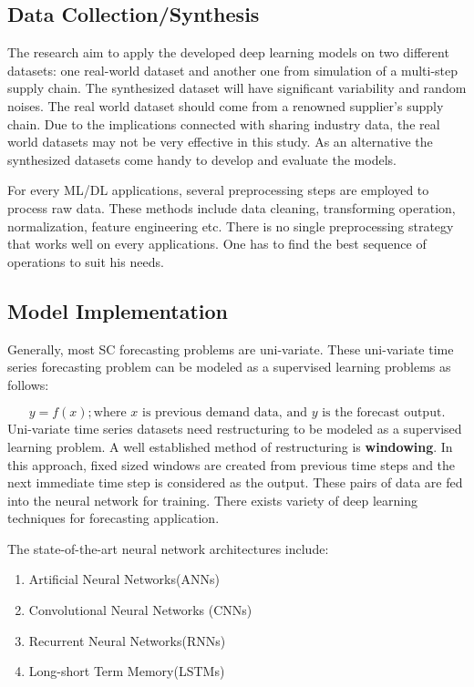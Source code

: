 \subsection{Data Collection/Synthesis}
The research aim to apply the developed deep learning models on two different datasets: one real-world dataset and another one from simulation of a multi-step supply chain. The synthesized dataset will have significant variability and random noises. The real world dataset should come from a renowned supplier's supply chain. 
Due to the implications connected with sharing industry data, the real world datasets may not be very effective in this study. As an alternative the synthesized datasets come handy to develop and evaluate the models.

For every ML/DL applications, several preprocessing steps are employed to process raw data. These methods include data cleaning, transforming operation, normalization, feature engineering etc. There is no single preprocessing strategy that works well on every applications. One has to find the best sequence of operations to suit his needs\cite{kotsiantis2006data}. 


\subsection{Model Implementation}

Generally, most SC forecasting problems are uni-variate. These uni-variate time series forecasting problem can be modeled as a supervised learning problems as follows:

$$ y = f(x); \text{where $x$ is previous demand data, and $y$ is the forecast output.} $$
Uni-variate time series datasets need restructuring to be modeled as a supervised learning problem. A well established method of restructuring is \textbf{windowing}. In this approach, fixed sized windows are created from previous time steps and the next immediate time step is considered as the output. These pairs of data are fed into the neural network for training. There exists variety of deep learning techniques for forecasting application. 

\noindent The state-of-the-art neural network architectures include:
\begin{enumerate}
    \item{Artificial Neural Networks(ANNs)}
    \item{Convolutional Neural Networks (CNNs)}
    \item{Recurrent Neural Networks(RNNs)}
    \item{Long-short Term Memory(LSTMs)}
\end{enumerate}

